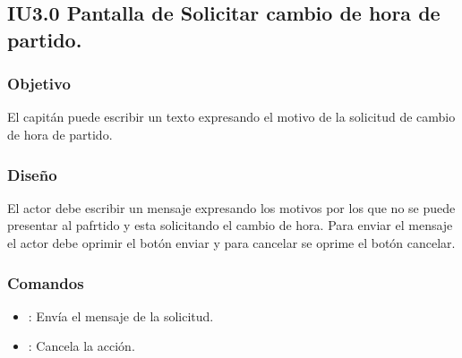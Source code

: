 \subsection{IU3.0 Pantalla de Solicitar cambio de hora de partido.}

\subsubsection{Objetivo}
	El capitán puede escribir un texto expresando el motivo de la solicitud de cambio de hora de partido.

\subsubsection{Diseño}
  El actor debe escribir un mensaje expresando los motivos por los que no se puede presentar al pafrtido y esta solicitando el cambio de hora.
  Para enviar el mensaje el actor debe oprimir el botón enviar y para cancelar se oprime el botón cancelar.


\subsubsection{Comandos}
\begin{itemize}
	\item {}: Envía el mensaje de la solicitud.
  \item {}: Cancela la acción.
\end{itemize}
